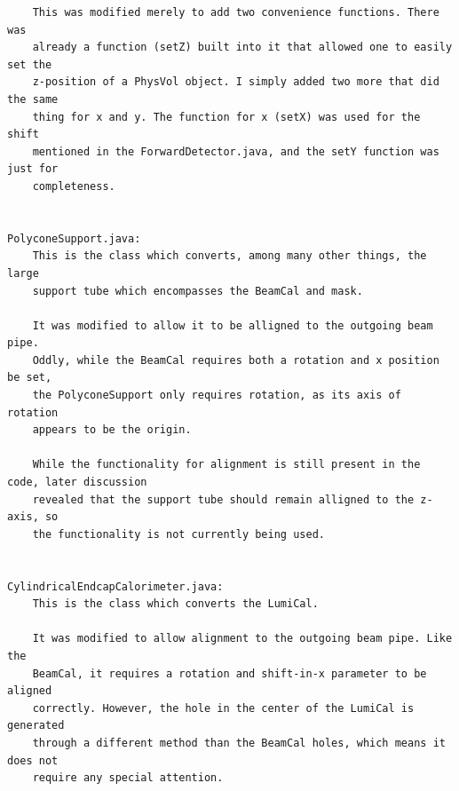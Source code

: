 \documentclass{report}
\begin{document}
\begin{verbatim}
    This was modified merely to add two convenience functions. There was
    already a function (setZ) built into it that allowed one to easily set the
    z-position of a PhysVol object. I simply added two more that did the same
    thing for x and y. The function for x (setX) was used for the shift
    mentioned in the ForwardDetector.java, and the setY function was just for
    completeness.


PolyconeSupport.java:
    This is the class which converts, among many other things, the large
    support tube which encompasses the BeamCal and mask.

    It was modified to allow it to be alligned to the outgoing beam pipe.
    Oddly, while the BeamCal requires both a rotation and x position be set,
    the PolyconeSupport only requires rotation, as its axis of rotation
    appears to be the origin.

    While the functionality for alignment is still present in the code, later discussion
    revealed that the support tube should remain alligned to the z-axis, so
    the functionality is not currently being used.


CylindricalEndcapCalorimeter.java:
    This is the class which converts the LumiCal.

    It was modified to allow alignment to the outgoing beam pipe. Like the
    BeamCal, it requires a rotation and shift-in-x parameter to be aligned
    correctly. However, the hole in the center of the LumiCal is generated
    through a different method than the BeamCal holes, which means it does not
    require any special attention.
\end{verbatim}
\end{document}
